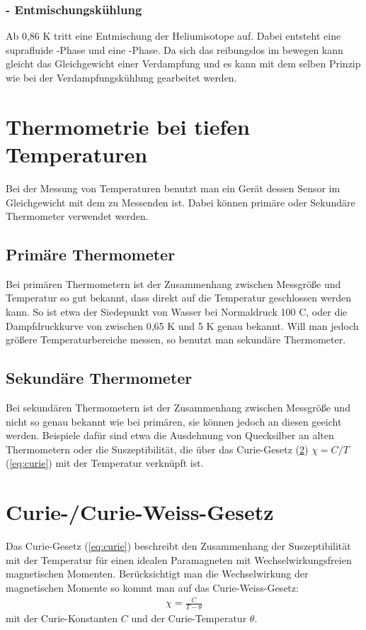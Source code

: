 \documentclass[twoside,colorback,accentcolor=tud4c,11pt]{tudreport}
\begin{document}
\subsubsection{- Entmischungskühlung}
Ab 0,86 K tritt eine Entmischung der Heliumisotope auf. Dabei entsteht eine suprafluide -Phase und eine -Phase. Da sich das  reibungslos im  bewegen kann gleicht das Gleichgewicht einer Verdampfung und es kann mit dem selben Prinzip wie bei der Verdampfungskühlung gearbeitet werden.
\section{Thermometrie bei tiefen Temperaturen}
Bei der Messung von Temperaturen benutzt man ein Gerät dessen Sensor im Gleichgewicht mit dem zu Messenden ist. Dabei können primäre oder Sekundäre Thermometer verwendet werden.
\subsection{Primäre Thermometer}
Bei primären Thermometern ist der Zusammenhang zwischen Messgröße und Temperatur so gut bekannt, dass direkt auf die Temperatur geschlossen werden kann. So ist etwa der Siedepunkt von Wasser bei Normaldruck 100 \degree C, oder die Dampfdruckkurve von  zwischen 0,65 K und 5 K genau bekannt. Will man jedoch größere Temperaturbereiche messen, so benutzt man sekundäre Thermometer.
\subsection{Sekundäre Thermometer}
Bei sekundären Thermometern ist der Zusammenhang zwischen Messgröße und nicht so genau bekannt wie bei primären, sie können jedoch an diesen geeicht werden. Beispiele dafür sind etwa die Ausdehnung von Quecksilber an alten Thermometern oder die Suszeptibilität, die über das Curie-Gesetz (\ref{sec:curie}) $ {\chi=C/T} $ (\ref{eq:curie}) mit der Temperatur verknüpft ist.
\section{Curie-/Curie-Weiss-Gesetz}\label{sec:curie}
Das Curie-Gesetz (\ref{eq:curie}) beschreibt den Zusammenhang der Suszeptibilität mit der Temperatur für einen idealen Paramagneten mit Wechselwirkungsfreien magnetischen Momenten. Berücksichtigt man die Wechselwirkung der magnetischen Momente so kommt man auf das Curie-Weiss-Gesetz:
\begin{align}\label{eq:weiss}
\chi=\frac{C}{T-\theta}
\end{align}
mit der Curie-Konstanten $C$ und der Curie-Temperatur $\theta$.
\end{document}
